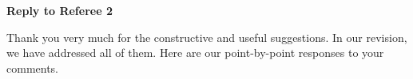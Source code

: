 \documentclass[a4paper,12pt]{article}
\begin{document}
\begin{enumerate}[label=(\arabic*),leftmargin=0.7cm]


\end{enumerate}



\newpage
\begin{center}
{\large \bf Reply to Referee 2} 
\end{center}


Thank you very much for the constructive and useful suggestions. In our revision, we have addressed all of them. Here are our point-by-point responses to your comments. 
\end{document}
